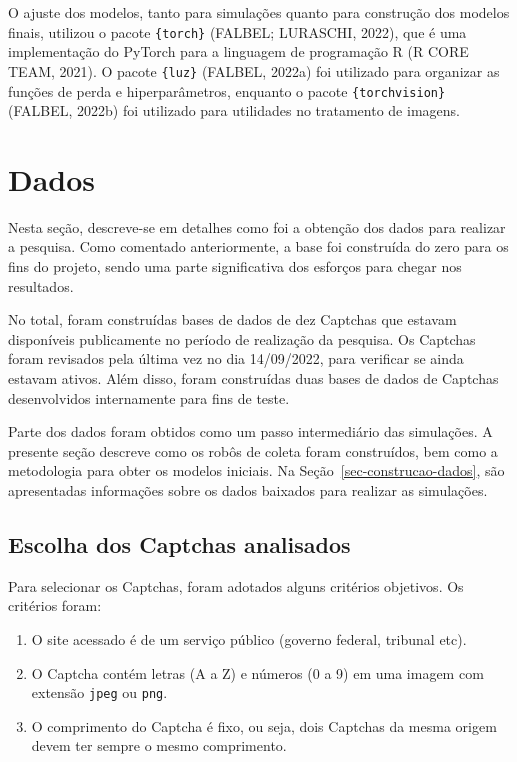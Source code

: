 \documentclass[12pt,twoside,brazilian]{book}
\providecommand{\tightlist}{%
  \setlength{\itemsep}{0pt}\setlength{\parskip}{0pt}}
\begin{document}
O ajuste dos modelos, tanto para simulações quanto para construção dos
modelos finais, utilizou o pacote \texttt{\{torch\}} (FALBEL; LURASCHI,
2022), que é uma implementação do PyTorch para a linguagem de
programação R (R CORE TEAM, 2021). O pacote \texttt{\{luz\}} (FALBEL,
2022a) foi utilizado para organizar as funções de perda e
hiperparâmetros, enquanto o pacote \texttt{\{torchvision\}} (FALBEL,
2022b) foi utilizado para utilidades no tratamento de imagens.

\hypertarget{dados}{%
\section{Dados}\label{dados}}

Nesta seção, descreve-se em detalhes como foi a obtenção dos dados para
realizar a pesquisa. Como comentado anteriormente, a base foi construída
do zero para os fins do projeto, sendo uma parte significativa dos
esforços para chegar nos resultados.

No total, foram construídas bases de dados de dez Captchas que estavam
disponíveis publicamente no período de realização da pesquisa. Os
Captchas foram revisados pela última vez no dia 14/09/2022, para
verificar se ainda estavam ativos. Além disso, foram construídas duas
bases de dados de Captchas desenvolvidos internamente para fins de
teste.

Parte dos dados foram obtidos como um passo intermediário das
simulações. A presente seção descreve como os robôs de coleta foram
construídos, bem como a metodologia para obter os modelos iniciais. Na
Seção~\ref{sec-construcao-dados}, são apresentadas informações sobre os
dados baixados para realizar as simulações.

\hypertarget{escolha-dos-captchas-analisados}{%
\subsection{Escolha dos Captchas
analisados}\label{escolha-dos-captchas-analisados}}

Para selecionar os Captchas, foram adotados alguns critérios objetivos.
Os critérios foram:

\begin{enumerate}
\def\labelenumi{\arabic{enumi}.}
\tightlist
\item
  O site acessado é de um serviço público (governo federal, tribunal
  etc).
\item
  O Captcha contém letras (A a Z) e números (0 a 9) em uma imagem com
  extensão \texttt{jpeg} ou \texttt{png}.
\item
  O comprimento do Captcha é fixo, ou seja, dois Captchas da mesma
  origem devem ter sempre o mesmo comprimento.
\end{enumerate}
\end{document}
